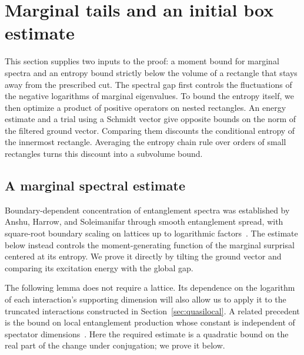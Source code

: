 \section{Marginal tails and an initial box estimate}
\label{sec:initial}

This section supplies two inputs to the proof: a moment bound for marginal
spectra and an entropy bound strictly below the volume of a rectangle that
stays away from the prescribed cut.  The spectral gap first controls the
fluctuations of the negative logarithms of marginal eigenvalues.  To bound
the entropy itself, we then optimize a product of positive operators on
nested rectangles.  An energy estimate and a trial using a Schmidt vector
give opposite bounds on the norm of the filtered ground vector.  Comparing
them discounts the conditional entropy of the innermost rectangle.
Averaging the entropy chain rule over
orders of small rectangles turns this discount into a subvolume bound.

\subsection{A marginal spectral estimate}

Boundary-dependent concentration of entanglement spectra was established
by Anshu, Harrow, and Soleimanifar through smooth entanglement spread,
with square-root boundary scaling on lattices up to logarithmic
factors~\cite{AnshuHarrowSoleimanifar2022}.  The estimate below instead
controls the moment-generating function of the marginal surprisal
centered at its entropy.  We prove it directly by tilting the ground
vector and comparing its excitation energy with the global gap.

The following lemma does not require a lattice.  Its dependence on the
logarithm of each interaction's supporting dimension will also allow us
to apply it to the truncated interactions constructed in
Section~\ref{sec:quasilocal}.  A related precedent is the bound on local
entanglement production whose constant is independent of spectator
dimensions~\cite{VanAcoleyenMarienVerstraete2013}.  Here the required
estimate is a quadratic bound on the real part of the change under
conjugation; we prove it below.

